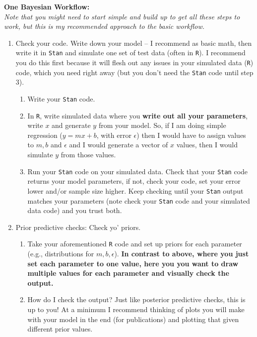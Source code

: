 \documentclass[11pt,letter]{article}
\begin{document}

\renewcommand{\refname}{\CHead{}}

{\bf One Bayesian Workflow:} \\
\emph{Note that you might need to start simple and build up to get all these steps to work, but this is my recommended approach to the basic workflow.}

\begin{enumerate}
\item Check your code. Write down your model -- I recommend as basic math, then write it in \verb|Stan| and simulate one set of test data (often in \verb|R|). I recommend you do this first because it will flesh out any issues in your simulated data (\verb|R|) code, which you need right away (but you don't need the \verb|Stan| code until step 3).
\begin{enumerate}
\item Write your \verb|Stan| code.
\item In \verb|R|, write simulated data where you {\bf write out all your parameters}, write $x$ and generate $y$ from your model. So, if I am doing simple regression ($y=mx+b$, with error $\epsilon$) then I would have to assign values to $m, b$ and $\epsilon$ and I would generate a vector of $x$ values, then I would simulate $y$ from those values.
\item Run your \verb|Stan| code on your simulated data. Check that your \verb|Stan| code returns your model parameters, if not, check your code, set your error lower and/or sample size higher. Keep checking until your \verb|Stan| output matches your parameters (note check your \verb|Stan| code and your simulated data code) and you trust both.
\end{enumerate}
\item Prior predictive checks: Check yo' priors.
\begin{enumerate}
\item Take your aforementioned \verb|R| code and set up priors for each parameter (e.g., distributions for $m, b, \epsilon$). {\bf In contrast to above, where you just set each parameter to one value, here you you want to draw multiple values for each parameter and visually check the output.} 
\item How do I check the output? Just like posterior predictive checks, this is up to you! At a minimum I recommend thinking of plots you will make with your model in the end (for publications) and plotting that given different prior values.

\end{enumerate}
\end{enumerate}
\end{document}
